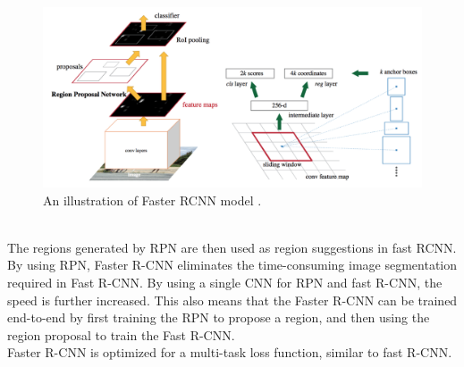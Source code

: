 \begin{figure}[ht!]
	\centerline{\includegraphics[width=1\linewidth]{Figs/faster.png}}
	\caption{An illustration of Faster RCNN model \cite{DBLP:journals/corr/RenHG015}.}
	\label{fig:faster}
\end{figure}
\\The regions generated by RPN are then used as region suggestions in fast RCNN. By using RPN, Faster R-CNN eliminates the time-consuming image segmentation required in Fast R-CNN. By using a single CNN for RPN and fast R-CNN, the speed is further increased. This also means that the Faster R-CNN can be trained end-to-end by first training the RPN to propose a region, and then using the region proposal to train the Fast R-CNN.
\\Faster R-CNN is optimized for a multi-task loss function, similar to fast R-CNN.
